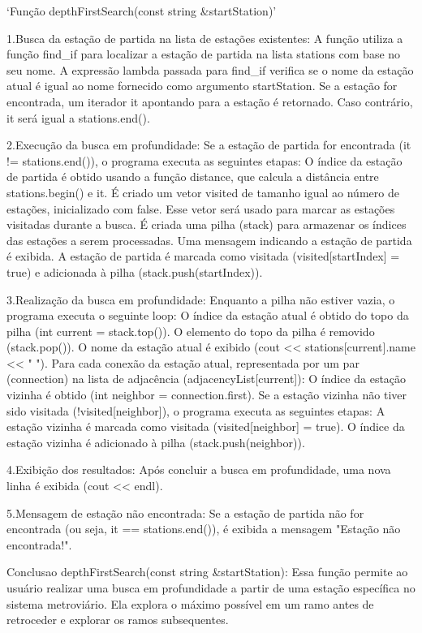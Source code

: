 `Função depthFirstSearch(const string &startStation)'

1.Busca da estação de partida na lista de estações existentes:
A função utiliza a função find_if para localizar a estação de partida na lista stations com base no seu nome. A expressão lambda passada para find_if verifica se o nome da estação atual é igual ao nome fornecido como argumento startStation.
Se a estação for encontrada, um iterador it apontando para a estação é retornado. Caso contrário, it será igual a stations.end().

2.Execução da busca em profundidade:
Se a estação de partida for encontrada (it != stations.end()), o programa executa as seguintes etapas:
O índice da estação de partida é obtido usando a função distance, que calcula a distância entre stations.begin() e it.
É criado um vetor visited de tamanho igual ao número de estações, inicializado com false. Esse vetor será usado para marcar as estações visitadas durante a busca.
É criada uma pilha (stack) para armazenar os índices das estações a serem processadas.
Uma mensagem indicando a estação de partida é exibida.
A estação de partida é marcada como visitada (visited[startIndex] = true) e adicionada à pilha (stack.push(startIndex)).

3.Realização da busca em profundidade:
Enquanto a pilha não estiver vazia, o programa executa o seguinte loop:
O índice da estação atual é obtido do topo da pilha (int current = stack.top()).
O elemento do topo da pilha é removido (stack.pop()).
O nome da estação atual é exibido (cout << stations[current].name << " ").
Para cada conexão da estação atual, representada por um par (connection) na lista de adjacência (adjacencyList[current]):
O índice da estação vizinha é obtido (int neighbor = connection.first).
Se a estação vizinha não tiver sido visitada (!visited[neighbor]), o programa executa as seguintes etapas:
A estação vizinha é marcada como visitada (visited[neighbor] = true).
O índice da estação vizinha é adicionado à pilha (stack.push(neighbor)).

4.Exibição dos resultados:
Após concluir a busca em profundidade, uma nova linha é exibida (cout << endl).

5.Mensagem de estação não encontrada:
Se a estação de partida não for encontrada (ou seja, it == stations.end()), é exibida a mensagem "Estação não encontrada!".

Conclusao depthFirstSearch(const string &startStation):
Essa função permite ao usuário realizar uma busca em profundidade a partir de uma estação específica no sistema metroviário. 
Ela explora o máximo possível em um ramo antes de retroceder e explorar os ramos subsequentes.

